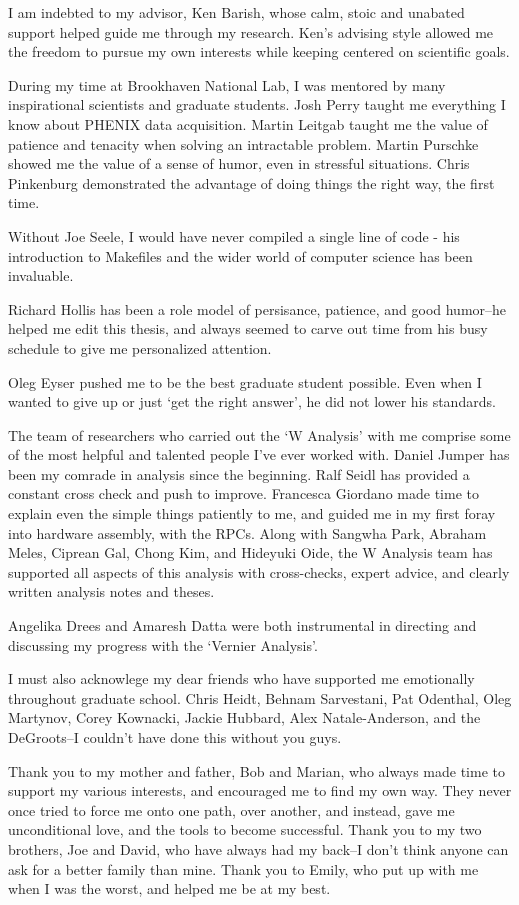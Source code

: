 I am indebted to my advisor, Ken Barish, whose calm, stoic and unabated support
helped guide me through my research. Ken's advising style allowed me the
freedom to pursue my own interests while keeping centered on scientific goals.

During my time at Brookhaven National Lab, I was mentored by many inspirational
scientists and graduate students. Josh Perry taught me everything I know about
PHENIX data acquisition. Martin Leitgab taught me the value of patience and
tenacity when solving an intractable problem. Martin Purschke showed me the
value of a sense of humor, even in stressful situations. Chris Pinkenburg
demonstrated the advantage of doing things the right way, the first time.

Without Joe Seele, I would have never compiled a single line of code - his
introduction to Makefiles and the wider world of computer science has been
invaluable. 

Richard Hollis has been a role model of persisance, patience, and good humor--he
helped me edit this thesis, and always seemed to carve out time from his
busy schedule to give me personalized attention.

Oleg Eyser pushed me to be the best graduate student possible. Even when I
wanted to give up or just `get the right answer', he did not lower his
standards.

The team of researchers who carried out the `W Analysis' with me comprise some
of the most helpful and talented people I've ever worked with. Daniel Jumper
has been my comrade in analysis since the beginning. Ralf Seidl has provided a
constant cross check and push to improve. Francesca Giordano made time to
explain even the simple things patiently to me, and guided me in my first foray
into hardware assembly, with the RPCs. Along with Sangwha Park, Abraham Meles,
Ciprean Gal, Chong Kim, and Hideyuki Oide, the W Analysis team has supported
all aspects of this analysis with cross-checks, expert advice, and clearly
written analysis notes and theses.

Angelika Drees and Amaresh Datta were both instrumental in directing and
discussing my progress with the `Vernier Analysis'.

I must also acknowlege my dear friends who have supported me emotionally
throughout graduate school. Chris Heidt, Behnam Sarvestani, Pat Odenthal, Oleg
Martynov, Corey Kownacki, Jackie Hubbard, Alex Natale-Anderson, and the
DeGroots--I couldn't have done this without you guys.

Thank you to my mother and father, Bob and Marian, who always made time to
support my various interests, and encouraged me to find my own way. They never
once tried to force me onto one path, over another, and instead, gave me
unconditional love, and the tools to become successful.  Thank you to my two
brothers, Joe and David, who have always had my back--I don't think anyone can
ask for a better family than mine.  Thank you to Emily, who put up with me when
I was the worst, and helped me be at my best.  
